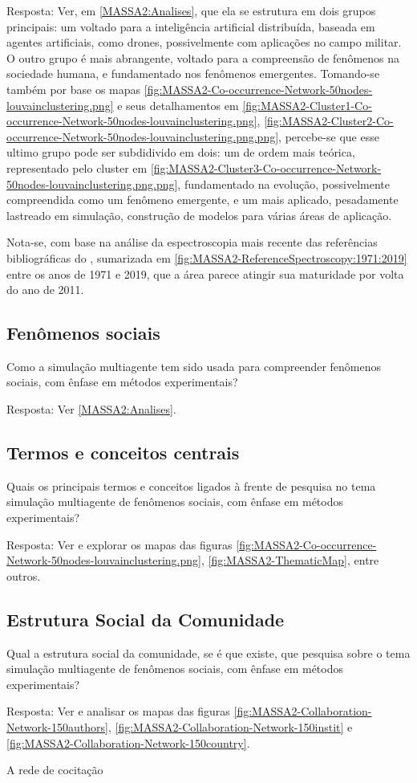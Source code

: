 Resposta: Ver, em \ref{MASSA2:Analises}, que ela se estrutura em dois grupos principais: um voltado para a inteligência artificial distribuída, baseada em agentes artificiais, como drones, possivelmente com aplicações no campo militar.
O outro grupo é mais abrangente, voltado para a compreensão de fenômenos na sociedade humana, e fundamentado
nos fenômenos emergentes.
Tomando-se também por base os mapas \ref{fig:MASSA2-Co-occurrence-Network-50nodes-louvainclustering.png} e seus detalhamentos em \ref{fig:MASSA2-Cluster1-Co-occurrence-Network-50nodes-louvainclustering.png}, \ref{fig:MASSA2-Cluster2-Co-occurrence-Network-50nodes-louvainclustering.png.png}, percebe-se que esse ultimo grupo pode ser subdidivido em dois: um de ordem mais teórica, representado pelo cluster em \ref{fig:MASSA2-Cluster3-Co-occurrence-Network-50nodes-louvainclustering.png.png}, fundamentado na evolução, possivelmente compreendida como um fenômeno emergente, e um mais aplicado, pesadamente lastreado em simulação, construção de modelos para várias áreas de aplicação.

Nota-se, com base na análise da espectroscopia mais recente das referências bibliográficas do \dataset, sumarizada em \ref{fig:MASSA2-ReferenceSpectroscopy:1971:2019} entre os anos de 1971 e 2019, que a área parece atingir sua maturidade por volta do ano de 2011.

\subsection{Fenômenos sociais}
   
Como a simulação multiagente tem sido usada para compreender fenômenos sociais, com ênfase em métodos experimentais? 

Resposta: Ver \ref{MASSA2:Analises}.

\subsection{Termos e conceitos centrais}

Quais os principais termos e conceitos ligados à frente de pesquisa no tema simulação multiagente de fenômenos sociais, com ênfase em métodos experimentais? 

Resposta: Ver e explorar os mapas das figuras \ref{fig:MASSA2-Co-occurrence-Network-50nodes-louvainclustering.png}, \ref{fig:MASSA2-ThematicMap}, entre outros.

\subsection{Estrutura Social da Comunidade}

Qual a estrutura social da comunidade, se é que existe, que pesquisa sobre o tema simulação multiagente de fenômenos sociais, com ênfase em métodos experimentais?

Resposta: Ver e analisar os mapas das figuras \ref{fig:MASSA2-Collaboration-Network-150authors}, \ref{fig:MASSA2-Collaboration-Network-150instit} e \ref{fig:MASSA2-Collaboration-Network-150country}.

A rede de cocitação 
